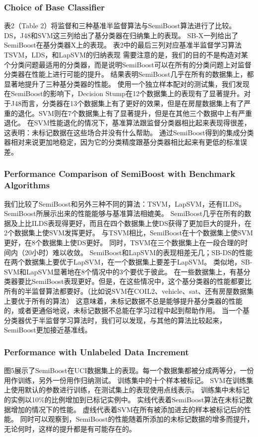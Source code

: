 \documentclass[10pt,journal,compsoc]{IEEEtran}
\begin{document}
\subsubsection{Choice of Base Classifier}
表2（Table 2）将监督和三种基准半监督算法与SemiBoost算法进行了比较。
DS，J48和SVM这三列给出了基分类器在归纳集上的表现。
SB-X一列给出了SemiBoost在基分类器X上的表现。
表2中的最后三列对应基准半监督学习算法TSVM，LDS，和LapSVM的归纳表现
需要注意的是，我们的目的不是构造对某个分类问题最适用的分类器，而是说明SemiBoost可以在所有的分类问题上对监督分类器在性能上进行可能的提升。
结果表明SemiBoost几乎在所有的数据集上，都显著地提升了三种基分类器的性能。
使用一个独立样本配对的测试集，我们发现在SemiBoost的影响下，Decision Stump在12个数据集上的表现有了显著提升。对于J48而言，分类器在13个数据集上有了更好的效果，但是在房屋数据集上有了严重的退化。SVM则在7个数据集上有了显著提升，但是在其他三个数据中上有严重退化。
在SVM性能退化的情况下，基准算法跟监督分类器相比起来表现得很差，这表明：未标记数据在这些场合并没有什么帮助。
通过SemiBoost得到的集成分类器相对来说更加地稳定，因为它的分类精度跟基分类器相比起来有更低的标准误差。\\

\subsubsection{Performance Comparison of SemiBoost with Benchmark Algorithms}
我们比较了SemiBoost和另外三种不同的算法：TSVM，LapSVM，还有ILDS。SemiBoost所展示出来的性能能够与基准算法相媲美。
SemiBoost几乎在所有的数据及上比ILDS表现得更好，而且在四个数据集上使DS获得了更加巨大的提升，在2个数据集上使SVM发挥更好。
与TSVM相比，SemiBoost在十个数据集上使SVM更好，在8个数据集上使DS更好。
同时，TSVM在三个数据集上在一段合理的时间内（20小时）难以收敛。
SemiBoost和LapSVM的表现相差无几；SB-DS的性能在两个数据集上要优于LapSVM，在一个数据集上要差于LapSVM。
类似地，SB-SVM和LapSVM显著地在8个情况中的3个要优于彼此。
在一些数据集上，有基分类器要比SemiBoost表现更好。但是，在这些情况中，这个基分类器的性能都要比所有的半监督算法都要好。（比如说SVM在COIL2、vehicle、sat、还有房屋数据集上要优于所有的算法）
这意味着，未标记数据不总是能够提升基分类器的性能的，或者更通俗地说，未标记数据不总能在学习过程中起到帮助作用。
当一个基分类器优于半监督学习算法时，我们可以发现，与其他的算法比较起来，SemiBoost更加接近基准线。\\

\subsubsection{Performance with Unlabeled Data Increment}
图5展示了SemiBoost在UCI数据集上的表现。每一个数据集都被分成两等分，一份用作训练，另外一份用作归纳测试。
训练集中的十个样本被标记。
SVM在训练集上使用默认的参数进行训练，在测试集上的表现使用点线表示。
训练集中未标记的实例以10\%的比例增加到已标记实例中。
实线代表着SemiBoost算法在未标记数据增加的情况下的性能。
虚线代表着SVM在所有被添加进去的样本被标记后的性能。
同时可以观察到，SemiBoost的性能随着所添加的未标记数据的增多而提升，无论何时，这样的提升都是有可能存在的。
\end{document}
